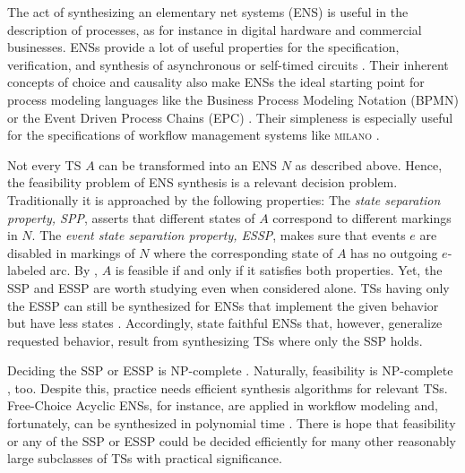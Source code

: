\documentclass[english]{lipics_hacked}
\begin{document}
The act of synthesizing an elementary net systems (ENS) is useful in the description of processes, as for instance in digital hardware and commercial businesses.
ENSs provide a lot of useful properties for the specification, verification, and synthesis of asynchronous or self-timed circuits \cite{C1996,YK1998}.
Their inherent concepts of choice and causality also make ENSs the ideal starting point for process modeling languages like the Business Process Modeling Notation (BPMN) or the Event Driven Process Chains (EPC) \cite{MBD2016}.
Their simpleness is especially useful for the specifications of workflow management systems like \textsc{milano} \cite{AM2000}.

Not every TS $A$ can be transformed into an ENS $N$ as described above.
Hence, the feasibility problem of ENS synthesis is a relevant decision problem.
Traditionally it is approached by the following properties:
The {\em state separation property, SPP}, asserts that different states of $A$ correspond to different markings in $N$.
The {\em event state separation property, ESSP}, makes sure that events $e$ are disabled in markings of $N$ where the corresponding state of $A$ has no outgoing $e$-labeled arc.
By \cite{BBD2015}, $A$ is feasible if and only if it satisfies both properties.
Yet, the SSP and ESSP are worth studying even when considered alone.
TSs having only the ESSP can still be synthesized for ENSs that implement the given behavior but have less states \cite{BBD2015}.
Accordingly, state faithful ENSs that, however, generalize requested behavior, result from synthesizing TSs where only the SSP holds.

Deciding the SSP or ESSP is NP-complete \cite{H1994}.
Naturally, feasibility is NP-complete \cite{BBD1997}, too.
Despite this, practice needs efficient synthesis algorithms for relevant TSs.
Free-Choice Acyclic ENSs, for instance, are applied in workflow modeling and, fortunately, can be synthesized in polynomial time \cite{AM2000}.
There is hope that feasibility or any of the SSP or ESSP could be decided efficiently for many other reasonably large subclasses of TSs with practical significance.
\end{document}
